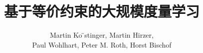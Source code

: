 \documentclass{article}
\title{基于等价约束的大规模度量学习}
\author{Martin Ko ̈stinger, Martin Hirzer,\\
  Paul Wohlhart, Peter M. Roth, Horst Bischof}
\date{}
\begin{document}
 \maketitle{}
 
 
 
 
 
 \renewcommand\refname{参考文献} 
 
 
 
\end{document}
